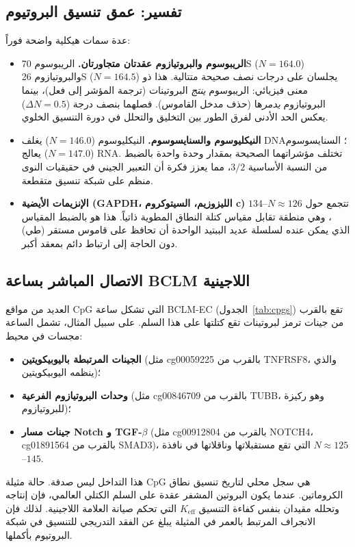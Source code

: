 \documentclass[11pt,a4paper]{article}
\begin{document}
	\subsection{تفسير: عمق تنسيق البروتيوم}
	
	عدة سمات هيكلية واضحة فوراً:
	\begin{itemize}
		\item \textbf{الريبوسوم والبروتيازوم عقدتان متجاورتان.} الريبوسوم 70S (\(N=164.0\)) والبروتيازوم 26S (\(N=164.5\)) يجلسان على درجات نصف صحيحة متتالية. هذا ذو معنى فيزيائي: الريبوسوم \emph{ينتج} البروتينات (ترجمة المؤشر إلى فعل)، بينما البروتيازوم \emph{يدمر}ها (حذف مدخل القاموس). فصلهما بنصف درجة (\(\Delta N = 0.5\)) يعكس الحد الأدنى لفرق الطور بين التخليق والتحلل في دورة التنسيق الخلوي.
		\item \textbf{النيكليوسوم والسنايسوسوم.} النيكليوسوم (\(N=146.0\)) يغلف DNA؛ السنايسوسوم (\(N=147.0\)) يعالج RNA. تختلف مؤشراتهما الصحيحة بمقدار وحدة واحدة بالضبط من النسبة الأساسية \(3/2\)، مما يعزز فكرة أن التعبير الجيني في حقيقيات النوى منظم على شبكة تنسيق متقطعة.
		\item \textbf{الإنزيمات الأيضية (GAPDH، الليزوزيم، السيتوكروم c)} تتجمع حول \(N \approx 126\)–\(134\)، وهي منطقة تقابل مقياس كتلة النطاق المطوية ذاتياً. هذا هو بالضبط المقياس الذي يمكن عنده لسلسلة عديد الببتيد الواحدة أن تحافظ على قاموس مستقر (طي) دون الحاجة إلى ارتباط دائم بمعقد أكبر.
	\end{itemize}
	
	\subsection{الاتصال المباشر بساعة BCLM اللاجينية}
	
	العديد من مواقع CpG التي تشكل ساعة BCLM-EC (الجدول~\ref{tab:cpgs}) تقع بالقرب من جينات ترمز لبروتينات تقع كتلتها على هذا السلم. على سبيل المثال، تشمل الساعة مجسات في محيط:
	\begin{itemize}
		\item \textbf{الجينات المرتبطة باليوبيكويتين} (مثل cg00059225 بالقرب من TNFRSF8، والذي ينظمه اليوبيكويتين)؛
		\item \textbf{وحدات البروتيازوم الفرعية} (مثل cg00846709 بالقرب من TUBB، وهو ركيزة للبروتيازوم)؛
		\item \textbf{جينات مسار Notch و TGF-\(\beta\)} (مثل cg00912804 بالقرب من NOTCH4، cg01891564 بالقرب من SMAD3)، التي تقع مستقبلاتها وناقلاتها في نافذة \(N \approx 125\)–\(145\).
	\end{itemize}
	
	هذا التداخل ليس صدفة. حالة مثيلة CpG هي سجل محلي لتاريخ تنسيق نطاق الكروماتين. عندما يكون البروتين المشفر عقدة على السلم الكتلي العالمي، فإن إنتاجه وتحلله مقيدان بنفس كفاءة التنسيق \(K_{\mathrm{eff}}\) التي تحكم صيانة العلامة اللاجينية. لذلك فإن الانجراف المرتبط بالعمر في المثيلة يبلغ عن الفقد التدريجي للتنسيق في شبكة البروتيوم بأكملها.
	
\end{document}
